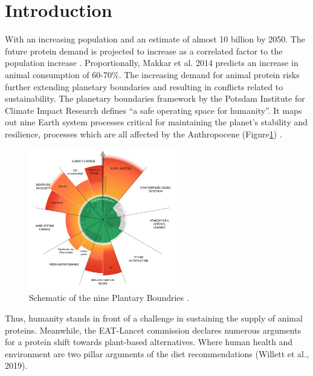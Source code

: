 \setcounter{chapter}{1}
\setcounter{section}{0}
\setlength{\headheight}{12.71342pt}
\addtolength{\topmargin}{-0.71342pt}

\section{Introduction}


\vspace{1em}
With an increasing population and an estimate of almost 10 billion by 2050. The future protein demand is projected to increase as a correlated factor to the population increase \cite*{henchion2017futureprotein}. Proportionally, Makkar et al. 2014 predicts an increase in animal consumption of 60-70\%. The increasing demand for animal protein risks further extending planetary boundaries and resulting in conflicts related to sustainability. The planetary boundaries framework by the Potsdam Institute for Climate Impact Research defines “a safe operating space for humanity”. It maps out nine Earth system processes critical for maintaining the planet's stability and resilience, processes which are all affected by the Anthropocene (Figure\ref*{fig:figure_01}) \cite*{Richardson2023EarthBeyondBoundaries}.

\begin{figure}[H]
    \centering
    \includegraphics[width=0.58\textwidth]{Figures/fig_01.png}
    \caption{Schematic of the nine Plantary Boundries \cite*{Richardson2023EarthBeyondBoundaries}.}
    \label{fig:figure_01}
\end{figure}

Thus, humanity stands in front of a challenge in sustaining the supply of animal proteins. Meanwhile, the EAT-Lancet commission declares numerous arguments for a protein shift towards plant-based alternatives. Where human health and environment are two pillar arguments of the diet recommendations (Willett et al., 2019).

